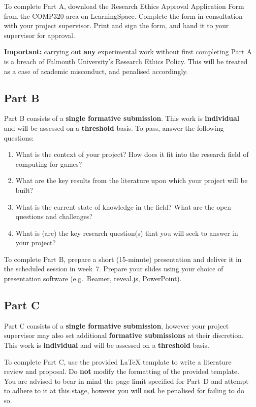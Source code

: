 \documentclass{../fal_assignment}
\begin{document}
To complete Part A, download the Research Ethics Approval Application Form
from the COMP320 area on LearningSpace.
Complete the form in consultation with your project supervisor.
Print and sign the form, and hand it to your supervisor for approval.

\textbf{Important:} carrying out \textbf{any} experimental work
without first completing Part A is a breach of Falmouth University's Research Ethics Policy.
This will be treated as a case of academic misconduct, and penalised accordingly.

\subsection*{Part B}

Part B consists of a \textbf{single formative submission}.
This work is \textbf{individual} and will be assessed on a \textbf{threshold} basis.
To pass, answer the following questions:

\begin{enumerate}[label=(\roman*)]
	\item What is the context of your project? How does it fit into the
		research field of computing for games?
	\item What are the key results from the literature upon which your project will be built?
	\item What is the current state of knowledge in the field?
		What are the open questions and challenges?
	\item What is (are) the key research question(s) that you will seek to
		answer in your project?
\end{enumerate}

To complete Part B, prepare a short (15-minute) presentation 
and deliver it in the scheduled session in week~7.
Prepare your slides using your choice of presentation software
(e.g.\ Beamer, reveal.js, PowerPoint).

\subsection*{Part C}

Part C consists of a \textbf{single formative submission},
however your project supervisor may also set additional \textbf{formative submissions} at their discretion.
This work is \textbf{individual} and will be assessed on a \textbf{threshold} basis.

To complete Part C, use the provided LaTeX template to write a literature review and proposal.
Do \textbf{not} modify the formatting of the provided template.
You are advised to bear in mind the page limit specified for Part~D
and attempt to adhere to it at this stage,
however you will \textbf{not} be penalised for failing to do so.
\end{document}
